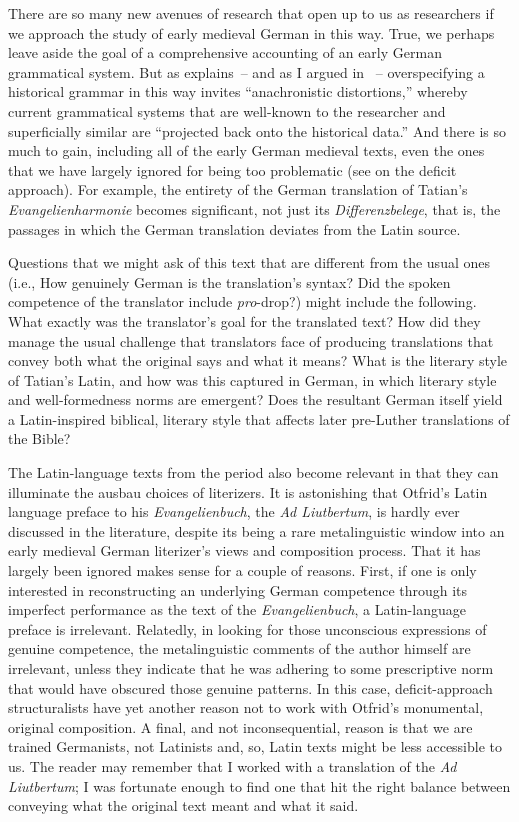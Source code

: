 There are so many new avenues of research that open up to us as researchers if we approach the study of early medieval German in this way. True, we perhaps leave aside the goal of a comprehensive accounting of an early German grammatical system. But as \citet[87]{Diewald2007} explains~-- and as I argued in ~-- overspecifying a historical grammar in this way invites “anachronistic distortions,” whereby current grammatical systems that are well-known to the researcher and superficially similar are “projected back onto the historical data.” And there is so much to gain, including all of the early German medieval texts, even the ones that we have largely ignored for being too problematic (see  on the deficit approach). For example, the entirety of the German translation of Tatian’s \textit{Evangelienharmonie} becomes significant, not just its \textit{Differenzbelege}, that is, the passages in which the German translation deviates from the Latin source.

Questions that we might ask of this text that are different from the usual ones (i.e., How genuinely German is the translation’s syntax? Did the spoken competence of the translator include \textit{pro}{}-drop?) might include the following. What exactly was the translator’s goal for the translated text? How did they manage the usual challenge that translators face of producing translations that convey both what the original says and what it means? What is the literary style of Tatian’s Latin, and how was this captured in German, in which literary style and well-formedness norms are emergent? Does the resultant German itself yield a Latin-inspired biblical, literary style that affects later pre-Luther translations of the Bible?

The Latin-language texts from the period also become relevant in that they can illuminate the ausbau choices of literizers. It is astonishing that Otfrid’s Latin language preface to his \textit{Evangelienbuch}, the \textit{Ad Liutbertum}, is hardly ever discussed in the literature, despite its being a rare metalinguistic window into an early medieval German literizer’s views and composition process. That it has largely been ignored makes sense for a couple of reasons. First, if one is only interested in reconstructing an underlying German competence through its imperfect performance as the text of the \textit{Evangelienbuch}, a Latin-language preface is irrelevant. Relatedly, in looking for those unconscious expressions of genuine competence, the metalinguistic comments of the author himself are irrelevant, unless they indicate that he was adhering to some prescriptive norm that would have obscured those genuine patterns. In this case, deficit-approach structuralists have yet another reason not to work with Otfrid’s monumental, original composition. A final, and not inconsequential, reason is that we are trained Germanists, not Latinists and, so, Latin texts might be less accessible to us. The reader may remember that I worked with a translation of the \textit{Ad Liutbertum}; I was fortunate enough to find one that hit the right balance between conveying what the original text meant and what it said.

